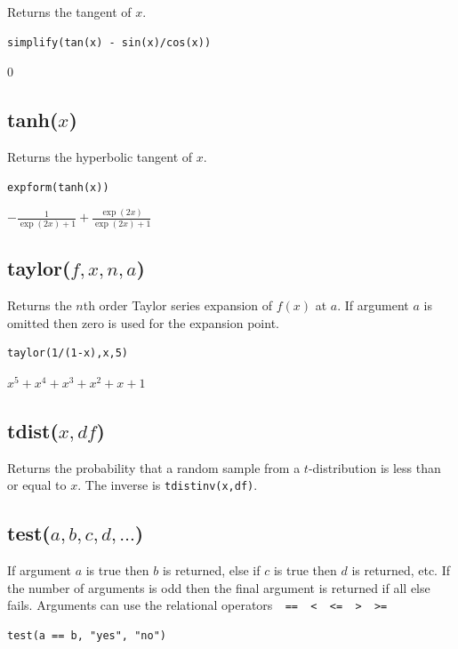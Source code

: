 \documentclass[12pt]{article}
\begin{document}
Returns the tangent of $x$.

{\color{blue}
\begin{verbatim}
simplify(tan(x) - sin(x)/cos(x))
\end{verbatim}
}

$0$

\subsection*{tanh($x$)}

Returns the hyperbolic tangent of $x$.

{\color{blue}
\begin{verbatim}
expform(tanh(x))
\end{verbatim}
}

$\displaystyle -\frac{1}{\exp(2x)+1}+\frac{\exp(2x)}{\exp(2x)+1}$

\subsection*{taylor($f,x,n,a$)}

Returns the $n$th order Taylor series expansion of $f(x)$ at $a$.
If argument $a$ is omitted then zero is used for the expansion point.

{\color{blue}
\begin{verbatim}
taylor(1/(1-x),x,5)
\end{verbatim}
}

$x^5+x^4+x^3+x^2+x+1$

\subsection*{tdist($x,df$)}

Returns the probability that a random sample from a $t$-distribution
is less than or equal to $x$.
The inverse is \verb$tdistinv(x,df)$.

\subsection*{test($a,b,c,d,\ldots$)}

If argument $a$ is true then $b$ is returned, else if $c$ is true then $d$ is returned, etc.
If the number of arguments is odd then the final argument is returned if all else fails.
Arguments can use the relational operators\verb$  ==  <  <=  >  >=$

{\color{blue}
\begin{verbatim}
test(a == b, "yes", "no")
\end{verbatim}
}
\end{document}
